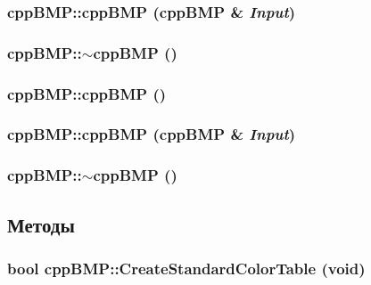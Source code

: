 \hypertarget{classcpp_b_m_p_97909a5d65342669eb673dc264600058}{
\subsubsection[{cppBMP}]{\setlength{\rightskip}{0pt plus 5cm}cppBMP::cppBMP ({\bf cppBMP} \& {\em Input})}}
\label{classcpp_b_m_p_97909a5d65342669eb673dc264600058}


\hypertarget{classcpp_b_m_p_ea62579b6a8a25449e108121de524019}{
\subsubsection[{$\sim$cppBMP}]{\setlength{\rightskip}{0pt plus 5cm}cppBMP::$\sim$cppBMP ()}}
\label{classcpp_b_m_p_ea62579b6a8a25449e108121de524019}


\hypertarget{classcpp_b_m_p_dd999f78c5b629a718c9ff82dca1b64a}{
\subsubsection[{cppBMP}]{\setlength{\rightskip}{0pt plus 5cm}cppBMP::cppBMP ()}}
\label{classcpp_b_m_p_dd999f78c5b629a718c9ff82dca1b64a}


\hypertarget{classcpp_b_m_p_97909a5d65342669eb673dc264600058}{
\subsubsection[{cppBMP}]{\setlength{\rightskip}{0pt plus 5cm}cppBMP::cppBMP ({\bf cppBMP} \& {\em Input})}}
\label{classcpp_b_m_p_97909a5d65342669eb673dc264600058}


\hypertarget{classcpp_b_m_p_ea62579b6a8a25449e108121de524019}{
\subsubsection[{$\sim$cppBMP}]{\setlength{\rightskip}{0pt plus 5cm}cppBMP::$\sim$cppBMP ()}}
\label{classcpp_b_m_p_ea62579b6a8a25449e108121de524019}




\subsection{Методы}
\hypertarget{classcpp_b_m_p_2784c5b22510793c4f33bb9f566de4a7}{
\subsubsection[{CreateStandardColorTable}]{\setlength{\rightskip}{0pt plus 5cm}bool cppBMP::CreateStandardColorTable (void)}}
\label{classcpp_b_m_p_2784c5b22510793c4f33bb9f566de4a7}


